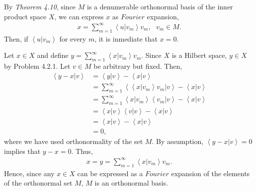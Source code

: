 \begin{questions}

\begin{solution}
By \textsl{Theorem 4.10}, since $M$ is a denumerable orthonormal basis of the inner product space $X$, we can express $x$ as $Fourier$ expansion,
\begin{align*}
x=\sum_{m=1}^\infty\left<u|v_m\right>v_m,~~~v_m\in M.
\end{align*}
Then, if $\left<u|v_m\right>$ for every $m$, it is inmediate that $x=0$.
\end{solution}
\begin{solution}
Let $x\in X$ and define $y=\sum_{m=1}^{\infty}\left<x|v_m \right>v_m$. Since $X$ is a Hilbert space, $y\in X$ by Problem 4.2.1. Let $v\in M$ be arbitrary but fixed. Then,
\begin{align*}
\left<y-x|v\right>&=\left<y|v\right>-\left<x|v\right>\\
&=\sum_{m=1}^{\infty}\left<\left<x|v_m \right> v_m|v\right>-\left<x|v\right>\\
&=\sum_{m=1}^{\infty}\left<x|v_m \right> \left<v_m|v\right>-\left<x|v\right>\\
&=\left<x|v \right> \left<v|v\right>-\left<x|v\right>\\
&=\left<x|v \right>-\left<x|v\right>\\
&=0,
\end{align*}
where we have used orthonormality of the set $M$. By assumption, $\left<y-x|v\right>=0$ implies that $y-x=0$. Thus,
\begin{align*}
x=y=\sum_{m=1}^{\infty}\left<x|v_m \right>v_m.
\end{align*}
Hence, since any $x\in X$ can be expressed as a $Fourier$ expansion of the elements of the orthonormal set $M$, $M$ is an orthonormal basis.
\end{solution}
\end{questions}